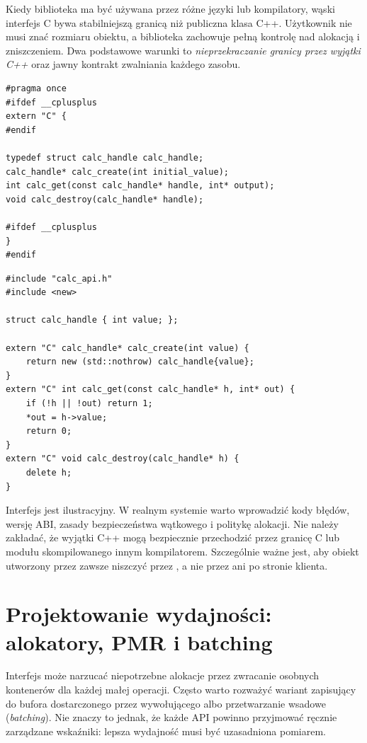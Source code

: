 Kiedy biblioteka ma być używana przez różne języki lub kompilatory,
wąski interfejs C bywa stabilniejszą granicą niż publiczna klasa C++.
Użytkownik nie musi znać rozmiaru obiektu, a biblioteka zachowuje
pełną kontrolę nad alokacją i zniszczeniem. Dwa podstawowe warunki to
\emph{nieprzekraczanie granicy przez wyjątki C++} oraz jawny kontrakt
zwalniania każdego zasobu.

\begin{lstlisting}[caption={calc\_api.h -- przyklad nieprzezroczystego uchwytu.}]
#pragma once
#ifdef __cplusplus
extern "C" {
#endif

typedef struct calc_handle calc_handle;
calc_handle* calc_create(int initial_value);
int calc_get(const calc_handle* handle, int* output);
void calc_destroy(calc_handle* handle);

#ifdef __cplusplus
}
#endif
\end{lstlisting}

\begin{lstlisting}[caption={calc\_api.cpp -- implementacja z obsluga bledu alokacji.}]
#include "calc_api.h"
#include <new>

struct calc_handle { int value; };

extern "C" calc_handle* calc_create(int value) {
    return new (std::nothrow) calc_handle{value};
}
extern "C" int calc_get(const calc_handle* h, int* out) {
    if (!h || !out) return 1;
    *out = h->value;
    return 0;
}
extern "C" void calc_destroy(calc_handle* h) {
    delete h;
}
\end{lstlisting}

Interfejs jest ilustracyjny. W realnym systemie warto wprowadzić
kody błędów, wersję ABI, zasady bezpieczeństwa wątkowego i politykę
alokacji. Nie należy zakładać, że wyjątki C++ mogą bezpiecznie
przechodzić przez granicę C lub modułu skompilowanego innym
kompilatorem. Szczególnie ważne jest, aby obiekt utworzony przez
 zawsze niszczyć przez ,
a nie przez  ani  po stronie klienta.

\section{Projektowanie wydajności: alokatory, PMR i batching}

Interfejs może narzucać niepotrzebne alokacje przez zwracanie
osobnych kontenerów dla każdej małej operacji. Często warto
rozważyć wariant zapisujący do bufora dostarczonego przez
wywołującego albo przetwarzanie wsadowe (\emph{batching}). Nie znaczy
to jednak, że każde API powinno przyjmować ręcznie zarządzane wskaźniki:
lepsza wydajność musi być uzasadniona pomiarem.

